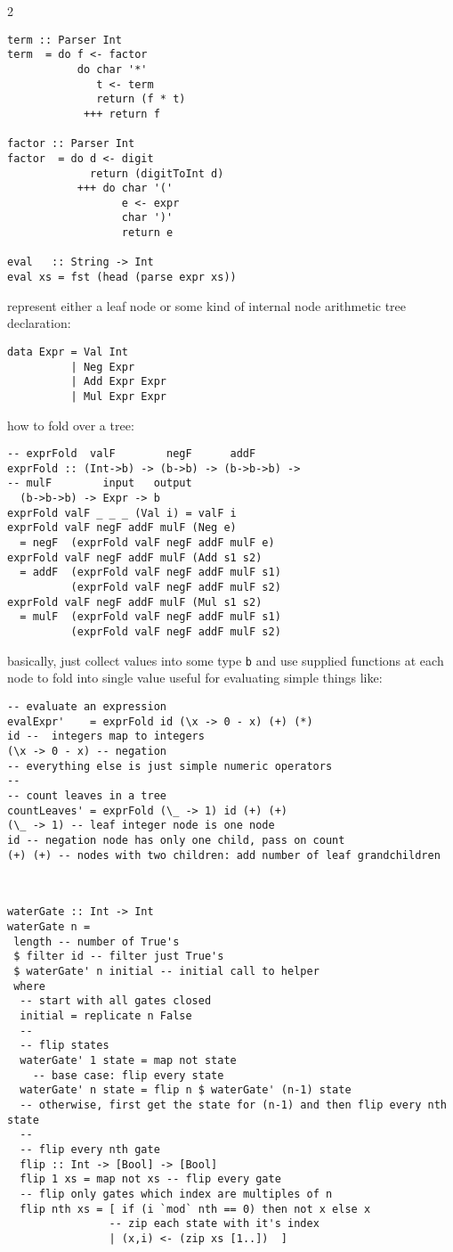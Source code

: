 \documentclass{article}
\def \columncount {2}
\newcommand{\codesize}{8.5}
\newcommand{\haskell}[1]{{\fontsize{\codesize}{\codesize}\selectfont\texttt{#1}}}
\begin{document}
\begin{multicols}{\columncount}
\begin{outline}[longenum]
\begin{verbatim}
term :: Parser Int
term  = do f <- factor
           do char '*'
              t <- term
              return (f * t)
            +++ return f

factor :: Parser Int
factor  = do d <- digit
             return (digitToInt d)
           +++ do char '('
                  e <- expr
                  char ')'
                  return e

eval   :: String -> Int
eval xs = fst (head (parse expr xs))
\end{verbatim}

  \1 represent either a leaf node or some kind of internal node
  \1 arithmetic tree declaration:
\begin{verbatim}
data Expr = Val Int
          | Neg Expr 
          | Add Expr Expr 
          | Mul Expr Expr
\end{verbatim}
  \1 how to fold over a tree:
\begin{verbatim}
-- exprFold  valF        negF      addF     
exprFold :: (Int->b) -> (b->b) -> (b->b->b) ->
-- mulF        input   output
  (b->b->b) -> Expr -> b
exprFold valF _ _ _ (Val i) = valF i
exprFold valF negF addF mulF (Neg e) 
  = negF  (exprFold valF negF addF mulF e)
exprFold valF negF addF mulF (Add s1 s2) 
  = addF  (exprFold valF negF addF mulF s1)
          (exprFold valF negF addF mulF s2)
exprFold valF negF addF mulF (Mul s1 s2) 
  = mulF  (exprFold valF negF addF mulF s1) 
          (exprFold valF negF addF mulF s2)
\end{verbatim}
    \2 basically, just collect values into some type \haskell{b} and use supplied functions at each node to fold into single value
    \2 useful for evaluating simple things like:
\begin{verbatim}
-- evaluate an expression
evalExpr'    = exprFold id (\x -> 0 - x) (+) (*)
id --  integers map to integers
(\x -> 0 - x) -- negation
-- everything else is just simple numeric operators
-- 
-- count leaves in a tree
countLeaves' = exprFold (\_ -> 1) id (+) (+)
(\_ -> 1) -- leaf integer node is one node
id -- negation node has only one child, pass on count
(+) (+) -- nodes with two children: add number of leaf grandchildren
\end{verbatim}


\begin{verbatim}


waterGate :: Int -> Int
waterGate n =
 length -- number of True's
 $ filter id -- filter just True's
 $ waterGate' n initial -- initial call to helper
 where
  -- start with all gates closed
  initial = replicate n False
  --
  -- flip states
  waterGate' 1 state = map not state 
    -- base case: flip every state
  waterGate' n state = flip n $ waterGate' (n-1) state
  -- otherwise, first get the state for (n-1) and then flip every nth state
  --
  -- flip every nth gate
  flip :: Int -> [Bool] -> [Bool]
  flip 1 xs = map not xs -- flip every gate
  -- flip only gates which index are multiples of n
  flip nth xs = [ if (i `mod` nth == 0) then not x else x
                -- zip each state with it's index
                | (x,i) <- (zip xs [1..])  ]


\end{verbatim}
\end{outline}
\end{multicols}
\end{document}

